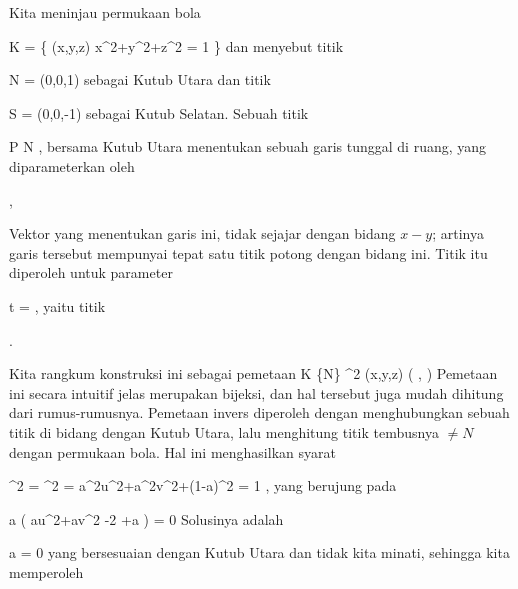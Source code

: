 {

Kita meninjau permukaan bola

\mavergleichskettedisp
{\vergleichskette
{ K
}
{ =} { \left\{ (x,y,z)  \mid   x^2+y^2+z^2 = 1        \right\}
}
{ } {
}
{ } {
}
{ } {
}
}
{}{}{}
dan menyebut titik

\mavergleichskette
{\vergleichskette
{ N
}
{ = }{ (0,0,1)
}
{  }{
}
{    }{
}
{   }{
}
}
{}{}{}
sebagai Kutub Utara dan titik

\mavergleichskette
{\vergleichskette
{ S
}
{ = }{ (0,0,-1)
}
{  }{
}
{    }{
}
{   }{
}
}
{}{}{}
sebagai Kutub Selatan. Sebuah titik

 {}
 {P \neq N} {}
 {} {} {} {,}
bersama Kutub Utara menentukan sebuah garis tunggal di ruang, yang diparameterkan oleh

 { , }

Vektor  yang menentukan garis ini, tidak sejajar dengan bidang $x-y$; artinya garis tersebut mempunyai tepat satu titik potong dengan bidang ini. Titik itu diperoleh untuk parameter

\mavergleichskettedisp
{\vergleichskette
{ t
}
{ =} { {  }
}
{ } {
}
{ } {
}
{ } {
}
}
{}{}{,}
yaitu titik

 { . }

Kita rangkum konstruksi ini sebagai pemetaan
\maabbeledisp {\alpha} {K \setminus \{N\}} { \R^2
} {(x,y,z)} { \left(  {  }, {  }  \right)
} {}
Pemetaan ini secara intuitif jelas merupakan bijeksi, dan hal tersebut juga mudah dihitung dari rumus-rumusnya. Pemetaan invers diperoleh dengan menghubungkan sebuah titik  di bidang dengan Kutub Utara, lalu menghitung titik tembusnya $\neq N$ dengan permukaan bola. Hal ini menghasilkan syarat

\mavergleichskettealignhandlinks
{\vergleichskettealignhandlinks
{  \Vert^2
}
{ =} {  \Vert^2
}
{ =} { a^2u^2+a^2v^2+(1-a)^2
}
{ =} { 1
}
{ } {
}
}
{}
{}{,}
yang berujung pada

\mavergleichskettedisp
{\vergleichskette
{ a \left(  au^2+av^2 -2 +a  \right)
}
{ =} { 0
}
{ } {
}
{ } {
}
{ } {
}
}
{}{}{}
Solusinya adalah

\mavergleichskette
{\vergleichskette
{ a
}
{ = }{ 0
}
{  }{
}
{    }{
}
{   }{
}
}
{}{}{}
yang bersesuaian dengan Kutub Utara dan tidak kita minati, sehingga kita memperoleh

}
